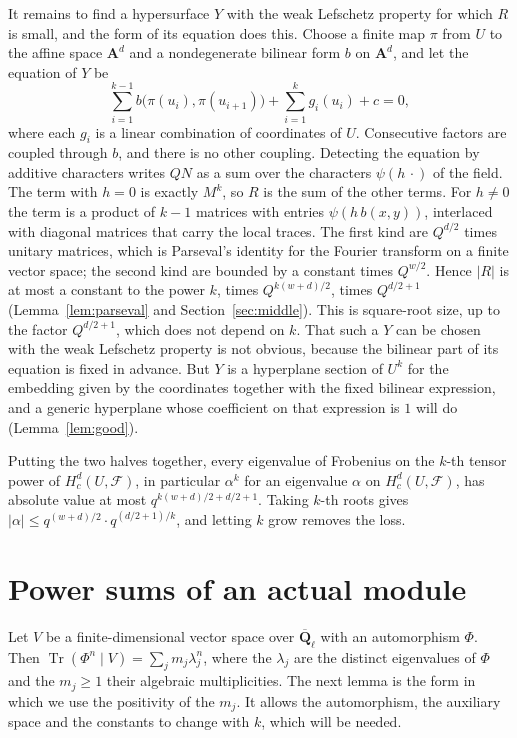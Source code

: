 \documentclass[11pt,a4paper]{article}
\theoremstyle{plain}
\theoremstyle{remark}
\newcommand{\Ql}{\overline{\mathbf Q}_\ell}
\newcommand{\A}{\mathbf A}
\newcommand{\F}{\mathcal F}
\newcommand{\Tr}{\operatorname{Tr}}
\begin{document}
It remains to find a hypersurface $Y$ with the weak Lefschetz property for which $R$ is small, and the form of its
equation does this. Choose a finite map $\pi$ from $U$ to the affine space $\A^d$ and a nondegenerate bilinear form
$b$ on $\A^d$, and let the equation of $Y$ be
\[
\sum_{i=1}^{k-1}b\bigl(\pi(u_i),\pi(u_{i+1})\bigr)+\sum_{i=1}^kg_i(u_i)+c=0,
\]
where each $g_i$ is a linear combination of coordinates of $U$. Consecutive factors are coupled through $b$, and
there is no other coupling. Detecting the equation by additive characters writes $QN$ as a sum over the characters
$\psi(h\,\cdot)$ of the field. The term with $h=0$ is exactly $M^k$, so $R$ is the sum of the other terms. For
$h\ne0$ the term is a product of $k-1$ matrices with entries $\psi(h\,b(x,y))$, interlaced with diagonal matrices
that carry the local traces. The first kind are $Q^{d/2}$ times unitary matrices, which is Parseval's identity for
the Fourier transform on a finite vector space; the second kind are bounded by a constant times $Q^{w/2}$. Hence
$|R|$ is at most a constant to the power $k$, times $Q^{k(w+d)/2}$, times $Q^{d/2+1}$ (Lemma~\ref{lem:parseval} and
Section~\ref{sec:middle}). This is square-root size, up to the factor $Q^{d/2+1}$, which does not depend on $k$. That
such a $Y$ can be chosen with the weak Lefschetz property is not obvious, because the bilinear part of its equation
is fixed in advance. But $Y$ is a hyperplane section of $U^k$ for the embedding given by the coordinates together
with the fixed bilinear expression, and a generic hyperplane whose coefficient on that expression is $1$ will do
(Lemma~\ref{lem:good}).

Putting the two halves together, every eigenvalue of Frobenius on the $k$-th tensor power of $H^d_c(U,\F)$, in
particular $\alpha^k$ for an eigenvalue $\alpha$ on $H^d_c(U,\F)$, has absolute value at most
$q^{k(w+d)/2+d/2+1}$. Taking $k$-th roots gives $|\alpha|\le q^{(w+d)/2}\cdot q^{(d/2+1)/k}$, and letting $k$ grow
removes the loss.

\section{Power sums of an actual module}\label{sec:power}

Let $V$ be a finite-dimensional vector space over $\Ql$ with an automorphism $\Phi$. Then
$\Tr(\Phi^n\mid V)=\sum_jm_j\lambda_j^n$, where the $\lambda_j$ are the distinct eigenvalues of $\Phi$ and the
$m_j\ge1$ their algebraic multiplicities. The next lemma is the form in which we use the positivity of the $m_j$. It
allows the automorphism, the auxiliary space and the constants to change with $k$, which will be needed.
\end{document}

